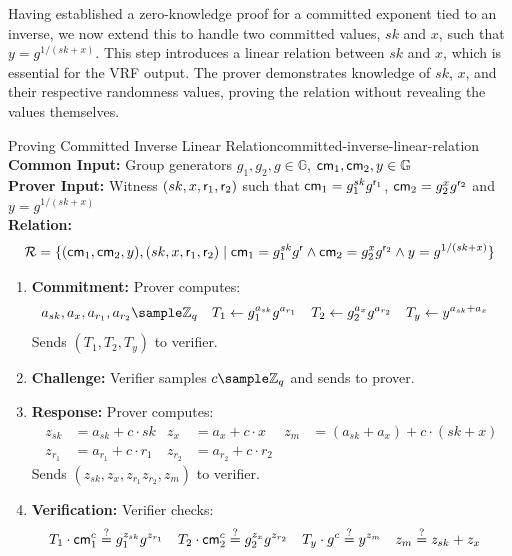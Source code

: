 Having established a zero-knowledge proof for a committed exponent tied to an inverse, we now extend this to handle two committed values, $sk$ and $x$, such that $y = g^{1/(sk + x)}$. This step introduces a linear relation between $sk$ and $x$, which is essential for the VRF output. The prover demonstrates knowledge of $sk$, $x$, and their respective randomness values, proving the relation without revealing the values themselves.


\begin{protocol}{Proving Committed Inverse Linear Relation}{committed-inverse-linear-relation}\label{pok-committed-inverse-linear-relation}
\textbf{Common Input:} Group generators $g_1, g_2, g \in \mathbb{G}$, $\mathsf{cm}_1, \mathsf{cm}_2, y \in \mathbb{G}$ \\
\textbf{Prover Input:} Witness $(sk, x, \mathsf{r}_1, \mathsf{r}_2)$ such that $\mathsf{cm}_1 = g_1^{sk} g^{\mathsf{r}_1}$, $\mathsf{cm}_2 = g_2^{x}g^{\mathsf{r}_2}$ and $ y = g^{1/(sk + x)}$ \\
\textbf{Relation: }
\[
\mathcal{R} = \{(\mathsf{cm}_1,\mathsf{cm}_2, y), (sk, x, \mathsf{r}_1, \mathsf{r}_2) \mid \mathsf{cm}_1 = g_1^{sk} g^{\mathsf{r}} \wedge \mathsf{cm}_2 = g_2^{x}g^{\mathsf{r}_2} \wedge y = g^{1/(sk + x)}\}
\]
\begin{enumerate}
    \item \textbf{Commitment:} Prover computes:
    \begin{align*}
        a_{sk}, a_x, a_{r_1}, a_{r_2} &\sample \Z_q & T_1 &\gets g_1^{a_{sk}} g^{a_{r_1}} & T_2 &\gets g_2^{a_x} g^{a_{r_2}} & T_y &\gets y^{a_{sk} + a_x}
    \end{align*}
    Sends $(T_1, T_2, T_y)$ to verifier.
    
    \item \textbf{Challenge:} Verifier samples $c \sample \mathbb{Z}_q$ and sends to prover.
    
    \item \textbf{Response:} Prover computes:
     \begin{align*}
        z_{sk} &= a_{sk} + c \cdot sk & z_x &= a_x + c \cdot x &  z_m &= (a_{sk} + a_x) + c \cdot (sk + x)\\   
        z_{r_1} &= a_{r_1} + c \cdot r_1 & z_{r_2} &= a_{r_2} + c \cdot r_2
    \end{align*}
    Sends $(z_{sk}, z_x, z_{r_1} z_{r_2}, z_m)$ to verifier.
    
    \item \textbf{Verification:} Verifier checks:
    \begin{align*}
        T_1 \cdot \mathsf{cm}_1^c &\stackrel{?}{=} g_1^{z_{sk}}g^{z_{r_1}} 
        &
        T_2 \cdot \mathsf{cm}_2^c &\stackrel{?}{=}  g_2^{z_x} g^{z_{r_2}} 
        &
        T_y \cdot g^c &\stackrel{?}{=} y^{z_m} &
        z_m &\stackrel{?}{=} z_{sk} + z_x
    \end{align*}
\end{enumerate}
\end{protocol}







